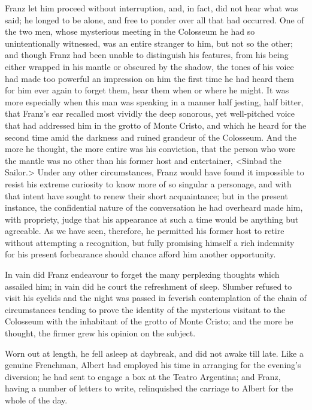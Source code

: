  Franz let him proceed without interruption, and, in fact, did not hear what was said; he longed to be alone, and free to ponder over all that had occurred. One of the two men, whose mysterious meeting in the Colosseum he had so unintentionally witnessed, was an entire stranger to him, but not so the other; and though Franz had been unable to distinguish his features, from his being either wrapped in his mantle or obscured by the shadow, the tones of his voice had made too powerful an impression on him the first time he had heard them for him ever again to forget them, hear them when or where he might. It was more especially when this man was speaking in a manner half jesting, half bitter, that Franz's ear recalled most vividly the deep sonorous, yet well-pitched voice that had addressed him in the grotto of Monte Cristo, and which he heard for the second time amid the darkness and ruined grandeur of the Colosseum. And the more he thought, the more entire was his conviction, that the person who wore the mantle was no other than his former host and entertainer, <Sinbad the Sailor.>  Under any other circumstances, Franz would have found it impossible to resist his extreme curiosity to know more of so singular a personage, and with that intent have sought to renew their short acquaintance; but in the present instance, the confidential nature of the conversation he had overheard made him, with propriety, judge that his appearance at such a time would be anything but agreeable. As we have seen, therefore, he permitted his former host to retire without attempting a recognition, but fully promising himself a rich indemnity for his present forbearance should chance afford him another opportunity. 

 In vain did Franz endeavour to forget the many perplexing thoughts which assailed him; in vain did he court the refreshment of sleep. Slumber refused to visit his eyelids and the night was passed in feverish contemplation of the chain of circumstances tending to prove the identity of the mysterious visitant to the Colosseum with the inhabitant of the grotto of Monte Cristo; and the more he thought, the firmer grew his opinion on the subject. 

 Worn out at length, he fell asleep at daybreak, and did not awake till late. Like a genuine Frenchman, Albert had employed his time in arranging for the evening's diversion; he had sent to engage a box at the Teatro Argentina; and Franz, having a number of letters to write, relinquished the carriage to Albert for the whole of the day. 

